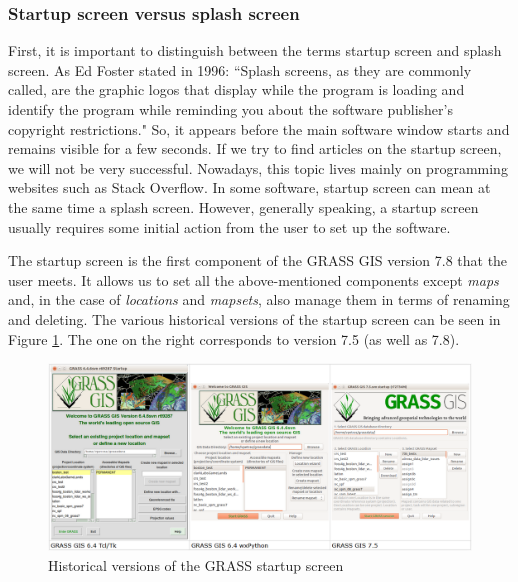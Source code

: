 \documentclass[a4paper,10pt,twoside]{article}
\begin{document}
\subsubsection{Startup screen versus splash screen}
\label{subsection:mechanism}
\noindent
\large
First, it is important to distinguish between the terms startup screen and splash screen. As Ed Foster stated in 1996: ``Splash screens, as they are commonly called, are the graphic logos that display while the program is loading and identify the program while reminding you about the software publisher's copyright restrictions." So, it appears before the main software window starts and remains visible for a few seconds. If we try to find articles on the startup screen, we will not be very successful. Nowadays, this topic lives mainly on programming websites such as Stack Overflow. In some software, startup screen can mean at the same time a splash screen. However, generally speaking, a startup screen usually requires some initial action from the user to set up the software. 

The startup screen is the first component of the GRASS GIS version 7.8 that the user meets. It allows us to set all the above-mentioned components except \textit{maps} and, in the case of \textit{locations} and \textit{mapsets}, also manage them in terms of renaming and deleting. The various historical versions of the startup screen can be seen in Figure \ref{fig:verze_startup}. The one on the right corresponds to version 7.5 (as well as 7.8).

\vspace{0.3cm}
\begin{figure}[hbt!]
\begin{center}
\includegraphics[width=17cm]{../pictures/verze_startup.png} 
\caption[Historical versions of the GRASS startup screen]{Historical versions of the GRASS startup screen}
\label{fig:verze_startup}
\end{center}
\end{figure}
\end{document}
